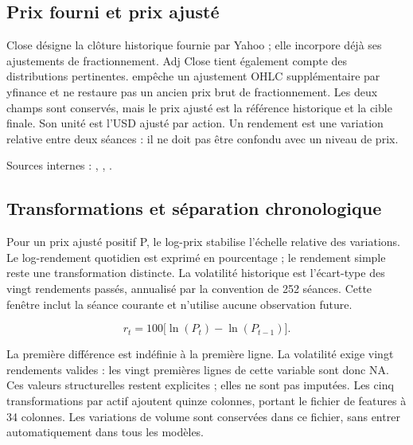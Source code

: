 \subsection{Prix fourni et prix ajusté}



Close désigne la clôture historique fournie par Yahoo ; elle incorpore déjà ses ajustements de fractionnement. Adj Close tient également compte des distributions pertinentes.  empêche un ajustement OHLC supplémentaire par yfinance et ne restaure pas un ancien prix brut de fractionnement. Les deux champs sont conservés, mais le prix ajusté est la référence historique et la cible finale. Son unité est l’USD ajusté par action. Un rendement est une variation relative entre deux séances : il ne doit pas être confondu avec un niveau de prix.



Sources internes : , , .





\subsection{Transformations et séparation chronologique}



Pour un prix ajusté positif P, le log-prix stabilise l’échelle relative des variations. Le log-rendement quotidien est exprimé en pourcentage ; le rendement simple reste une transformation distincte. La volatilité historique est l’écart-type des vingt rendements passés, annualisé par la convention de 252 séances. Cette fenêtre inclut la séance courante et n’utilise aucune observation future.



\begin{equation}\label{eq:returns} r_t=100\bigl[\ln(P_t)-\ln(P_{t-1})\bigr].\end{equation}



La première différence est indéfinie à la première ligne. La volatilité exige vingt rendements valides : les vingt premières lignes de cette variable sont donc NA. Ces valeurs structurelles restent explicites ; elles ne sont pas imputées. Les cinq transformations par actif ajoutent quinze colonnes, portant le fichier de features à 34 colonnes. Les variations de volume sont conservées dans ce fichier, sans entrer automatiquement dans tous les modèles.



